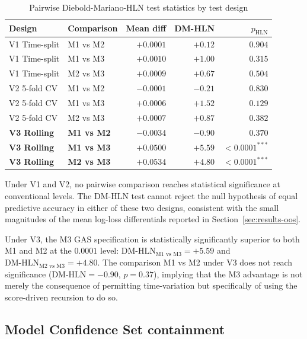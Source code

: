\documentclass[12pt,a4paper]{article}
\theoremstyle{plain}
\theoremstyle{definition}
\begin{document}
\begin{table}[!htbp]
\centering
\caption{Pairwise Diebold-Mariano-HLN test statistics by test design}
\label{tab:results-dm}
\begin{tabular}{llrrr}
\toprule
Design & Comparison & Mean diff & DM-HLN & $p_{\text{HLN}}$ \\
\midrule
V1 Time-split & M1 vs M2 & $+0.0001$ & $+0.12$ & $0.904$ \\
V1 Time-split & M1 vs M3 & $+0.0010$ & $+1.00$ & $0.315$ \\
V1 Time-split & M2 vs M3 & $+0.0009$ & $+0.67$ & $0.504$ \\
\midrule
V2 5-fold CV & M1 vs M2 & $-0.0001$ & $-0.21$ & $0.830$ \\
V2 5-fold CV & M1 vs M3 & $+0.0006$ & $+1.52$ & $0.129$ \\
V2 5-fold CV & M2 vs M3 & $+0.0007$ & $+0.87$ & $0.382$ \\
\midrule
\textbf{V3 Rolling} & \textbf{M1 vs M2} & $-0.0034$ & $-0.90$ & $0.370$ \\
\textbf{V3 Rolling} & \textbf{M1 vs M3} & $+0.0500$ & $\mathbf{+5.59}$ & $\mathbf{<0.0001^{***}}$ \\
\textbf{V3 Rolling} & \textbf{M2 vs M3} & $+0.0534$ & $\mathbf{+4.80}$ & $\mathbf{<0.0001^{***}}$ \\
\bottomrule
\end{tabular}
\end{table}

Under V1 and V2, no pairwise comparison reaches statistical significance at conventional levels. The DM-HLN test cannot reject the null hypothesis of equal predictive accuracy in either of these two designs, consistent with the small magnitudes of the mean log-loss differentials reported in Section~\ref{sec:results-oos}.

Under V3, the M3 GAS specification is statistically significantly superior to both M1 and M2 at the $0.0001$ level: $\text{DM-HLN}_{\text{M1 vs M3}} = +5.59$ and $\text{DM-HLN}_{\text{M2 vs M3}} = +4.80$. The comparison M1 vs M2 under V3 does not reach significance ($\text{DM-HLN} = -0.90$, $p = 0.37$), implying that the M3 advantage is not merely the consequence of permitting time-variation but specifically of using the score-driven recursion to do so.

\subsection{Model Confidence Set containment}
\label{sec:results-mcs}
\end{document}
